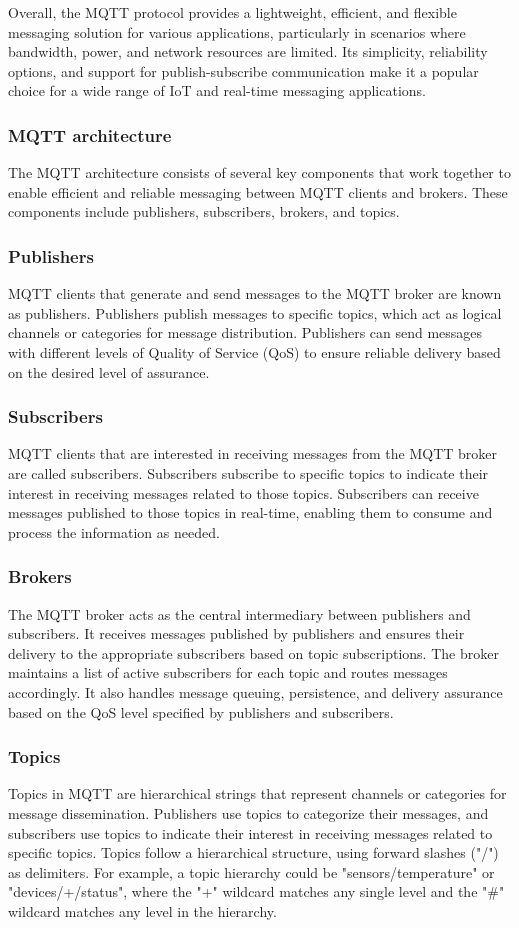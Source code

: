 \documentclass[
12pt,
oneside, 
onehalfspacing, 
nolistspacing, 
parskip, 
chapterinoneline, 
]{AASTCOMPUTER}
\begin{document}
Overall, the MQTT protocol provides a lightweight, efficient, and flexible messaging solution for various applications, particularly in scenarios where bandwidth, power, and network resources are limited. Its simplicity, reliability options, and support for publish-subscribe communication make it a popular choice for a wide range of IoT and real-time messaging applications.

\subsubsection{MQTT architecture}
The MQTT architecture \cite{soni2017survey} consists of several key components that work together to enable efficient and reliable messaging between MQTT clients and brokers. These components include publishers, subscribers, brokers, and topics.
\subsubsection{Publishers}
MQTT clients that generate and send messages to the MQTT broker are known as publishers. Publishers publish messages to specific topics, which act as logical channels or categories for message distribution. Publishers can send messages with different levels of Quality of Service (QoS) to ensure reliable delivery based on the desired level of assurance.
\subsubsection{Subscribers}
MQTT clients that are interested in receiving messages from the MQTT broker are called subscribers. Subscribers subscribe to specific topics to indicate their interest in receiving messages related to those topics. Subscribers can receive messages published to those topics in real-time, enabling them to consume and process the information as needed.
\subsubsection{Brokers}
The MQTT broker acts as the central intermediary between publishers and subscribers. It receives messages published by publishers and ensures their delivery to the appropriate subscribers based on topic subscriptions. The broker maintains a list of active subscribers for each topic and routes messages accordingly. It also handles message queuing, persistence, and delivery assurance based on the QoS level specified by publishers and subscribers.
\subsubsection{Topics}
Topics in MQTT are hierarchical strings that represent channels or categories for message dissemination. Publishers use topics to categorize their messages, and subscribers use topics to indicate their interest in receiving messages related to specific topics. Topics follow a hierarchical structure, using forward slashes ("/") as delimiters. For example, a topic hierarchy could be "sensors/temperature" or "devices/+/status", where the "+" wildcard matches any single level and the "\#" wildcard matches any level in the hierarchy.
\end{document}
